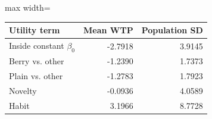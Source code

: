 \begin{adjustbox}{max width=\linewidth}
\begin{tabular}{lrr}\toprule
Utility term & Mean WTP & Population SD\\\midrule
Inside constant $\beta_0$ & -2.7918 & 3.9145 \\
Berry vs. other & -1.2390 & 1.7373 \\
Plain vs. other & -1.2783 & 1.7923 \\
Novelty & -0.0936 & 4.0589 \\
Habit & 3.1966 & 8.7728 \\
\bottomrule\end{tabular}
\end{adjustbox}
